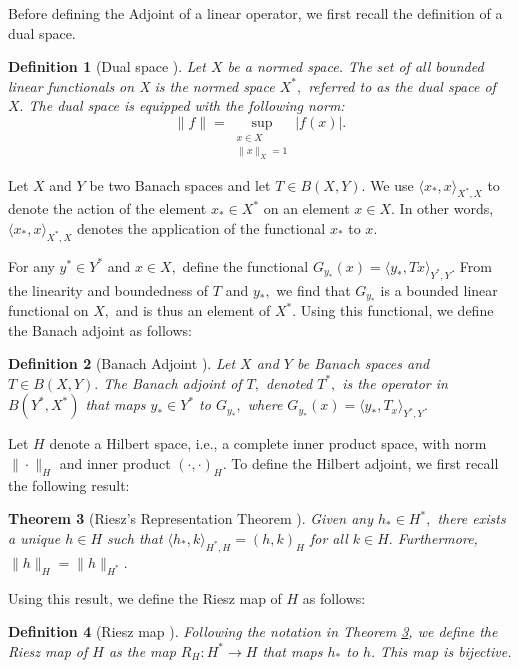 \documentclass[12pt,a4paper]{article}
\theoremstyle{boldthm}
\newtheorem{theorem}{Theorem}[section]
\theoremstyle{bolddefn}
\newtheorem{definition}[theorem]{Definition}
\begin{document}
Before defining the Adjoint of a linear operator, we first recall the definition of a dual space.
\begin{definition}[{Dual space \cite[2.10-3]{krey}}] 
    Let $X$ be a normed space. The set of all bounded linear functionals on X is the normed space $X^*,$ referred to as the dual space of $X.$ The dual space is equipped with the following norm:
    \begin{equation}
        \| f \| = \sup_{\substack{x \in X \\ \|x\|_X =1}} | f(x) |. 
    \end{equation}
\end{definition} 


Let $ X$ and $Y$ be two Banach spaces and let $T \in B(X, Y).$ We use $\langle x_*, x \rangle_{X^*, X}$ to denote the action of the element $x_* \in X^*$ on an element $x \in X.$ In other words, $\langle x_*, x \rangle_{X^*, X}$ denotes the application of the functional $x_*$ to $x.$ 

 For any $y^* \in Y^*$ and $x \in X,$ define the functional $G_{y_*}(x) = \langle y_*, Tx \rangle_{Y^*, Y}.$ From the linearity and boundedness of $T$ and $y_*,$ we find that $G_{y_*}$ is a bounded linear functional on $X,$ and is thus an element of $X^*$.
Using this functional, we define the Banach adjoint as follows:
\begin{definition}[Banach Adjoint \cite{umberto}] \label{BA}
    Let $X$ and $Y$ be Banach spaces and $T \in B(X, Y).$ The Banach adjoint of $T,$ denoted $T^*,$ is the operator in $B(Y^*, X^*)$ that maps $y_* \in Y^*$ to $G_{y_*},$ where $G_{y_*}(x) = \langle y_*, T_x \rangle_{Y^*, Y}.$
\end{definition}

Let $H$ denote a Hilbert space, i.e., a complete inner product space, with norm $\|\cdot\|_H$ and inner product $(\cdot, \cdot)_H.$ To define the Hilbert adjoint, we first recall the following result:
\begin{theorem}[{Riesz's Representation Theorem \cite[3.8-1]{krey}}]  \label{RR}
    Given any $h_* \in H^*,$ there exists a unique $h \in H$ such that $\langle h_*, k \rangle_{H^*, H} = (h, k)_H$ for all $k \in H.$ Furthermore, $\| h \|_H = \| h \|_{H^*}.$
\end{theorem}
Using this result, we define the Riesz map of $H$ as follows:
\begin{definition}[Riesz map \cite{umberto}]
    Following the notation in Theorem \ref{RR}, we define the Riesz map of $H$ as the map $R_H : H^* \rightarrow H$ that maps $h_*$ to $h.$ This map is bijective. 
\end{definition}
\end{document}

